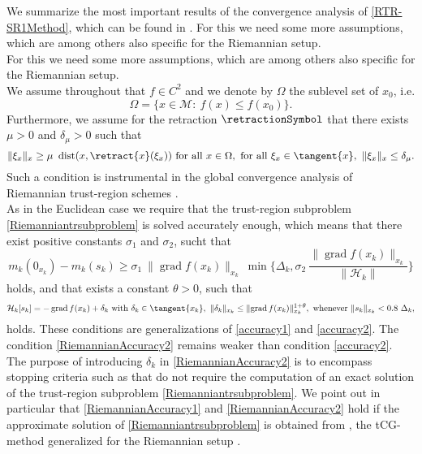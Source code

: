 We summarize the most important results of the convergence analysis of \cref{RTR-SR1Method}, which can be found in \cite{HuangAbsilGallivan:2014}. For this we need some more assumptions, which are among others also specific for the Riemannian setup. \\
For this we need some more assumptions, which are among others also specific for the Riemannian setup. \\
We assume throughout that $f \in C^2$ and we denote by $\Omega$ the sublevel set of $x_0$, i.e.
\begin{equation*}
    \Omega = \{ x \in \mathcal{M} \colon \ f(x) \leq f(x_0) \}.
\end{equation*}
Furthermore, we assume for the retraction $\retractionSymbol$ that there exists $\mu > 0$ and $\delta_{\mu} > 0$ such that
\begin{equation}\label{RetractionAssumption}
    \lVert \xi_x \rVert_x \geq \mu \ \operatorname{dist}(x, \retract{x}(\xi_x)) \text{ for all } x \in \Omega, \text{ for all } \xi_x \in \tangent{x}, \ \lVert \xi_x \rVert_x \leq \delta_{\mu}.
\end{equation}
Such a condition is instrumental in the global convergence analysis of Riemannian trust-region schemes \cite[p.~7]{HuangAbsilGallivan:2014}. \\
As in the Euclidean case we require that the trust-region subproblem \cref{Riemanniantrsubproblem} is solved accurately enough, which means that there exist positive constants $\sigma_1$ and $\sigma_2$, sucht that 
\begin{equation}\label{RiemannianAccuracy1}
    m_k(0_{x_k}) - m_k(s_k) \geq \sigma_1 \ \lVert \operatorname{grad} f(x_k) \rVert_{x_k} \ \min \{ \Delta_k, \sigma_2 \ \frac{\lVert \operatorname{grad} f(x_k) \rVert_{x_k}}{\lVert \mathcal{H}_k \rVert} \}
\end{equation} 
holds, and that exists a constant $\theta > 0$, such that 
\begin{equation}\label{RiemannianAccuracy2}
    \mathcal{H}_k [s_k] = - \operatorname{grad} f(x_k) + \delta_k \text{ with } \delta_k \in \tangent{x_k}, \ \lVert \delta_k \rVert_{x_k} \leq \lVert \operatorname{grad} f(x_k) \rVert^{1 + \theta}_{x_k}, \text{ whenever } \lVert s_k \rVert_{x_k} < 0.8 \ \Delta_k,
\end{equation}
holds. These conditions are generalizations of \cref{accuracy1} and \cref{accuracy2}. The condition \cref{RiemannianAccuracy2} remains weaker than condition \cref{accuracy2}. The purpose of introducing $\delta_k$ in \cref{RiemannianAccuracy2} is to encompass stopping criteria such as \cite[(7.10)]{AbsilMahonySepulchre:2008} that do not require the computation of an exact solution of the trust-region subproblem \cref{Riemanniantrsubproblem}. We point out in particular that \cref{RiemannianAccuracy1} and \cref{RiemannianAccuracy2} hold if the approximate solution of \cref{Riemanniantrsubproblem} is obtained from \cite[Algorithm~11]{AbsilMahonySepulchre:2008}, the tCG-method generalized for the Riemannian setup \cite[p.~7]{HuangAbsilGallivan:2014}. \\

